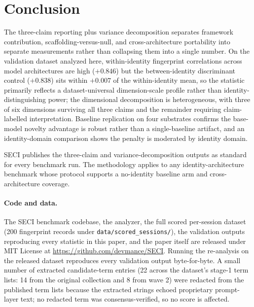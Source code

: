 \documentclass[11pt]{article}
\begin{document}
\section{Conclusion}
\label{sec:conclusion}

The three-claim reporting plus variance decomposition separates framework contribution, scaffolding-versus-null, and cross-architecture portability into separate measurements rather than collapsing them into a single number. On the validation dataset analyzed here, within-identity fingerprint correlations across model architectures are high ($+0.846$) but the between-identity discriminant control ($+0.838$) sits within $+0.007$ of the within-identity mean, so the statistic primarily reflects a dataset-universal dimension-scale profile rather than identity-distinguishing power; the dimensional decomposition is heterogeneous, with three of six dimensions surviving all three claims and the remainder requiring claim-labelled interpretation. Baseline replication on four substrates confirms the base-model novelty advantage is robust rather than a single-baseline artifact, and an identity-domain comparison shows the penalty is moderated by identity domain.

SECI publishes the three-claim and variance-decomposition outputs as standard for every benchmark run. The methodology applies to any identity-architecture benchmark whose protocol supports a no-identity baseline arm and cross-architecture coverage.

\paragraph{Code and data.}
The SECI benchmark codebase, the analyzer, the full scored per-session dataset (200 fingerprint records under \texttt{data/scored\_sessions/}), the validation outputs reproducing every statistic in this paper, and the paper itself are released under MIT License at \url{https://github.com/devmance/SECI}. Running the re-analysis on the released dataset reproduces every validation output byte-for-byte. A small number of extracted candidate-term entries (22 across the dataset's stage-1 term lists: 14 from the original collection and 8 from wave 2) were redacted from the published term lists because the extracted strings echoed proprietary prompt-layer text; no redacted term was consensus-verified, so no score is affected.


\end{document}

